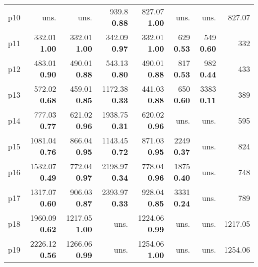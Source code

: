 \begin{tabular}{lrrrrrrr}
\multicolumn{1}{l|}{p10} & uns. & uns. & {\footnotesize 939.8} \textbf{0.88} & {\footnotesize 827.07} \textbf{1.00} & uns. & uns. & \multicolumn{1}{|r}{827.07}\\
\multicolumn{1}{l|}{p11} & {\footnotesize 332.01} \textbf{1.00} & {\footnotesize 332.01} \textbf{1.00} & {\footnotesize 342.09} \textbf{0.97} & {\footnotesize 332.01} \textbf{1.00} & {\footnotesize 629} \textbf{0.53} & {\footnotesize 549} \textbf{0.60} & \multicolumn{1}{|r}{332}\\
\multicolumn{1}{l|}{p12} & {\footnotesize 483.01} \textbf{0.90} & {\footnotesize 490.01} \textbf{0.88} & {\footnotesize 543.13} \textbf{0.80} & {\footnotesize 490.01} \textbf{0.88} & {\footnotesize 817} \textbf{0.53} & {\footnotesize 982} \textbf{0.44} & \multicolumn{1}{|r}{433}\\
\multicolumn{1}{l|}{p13} & {\footnotesize 572.02} \textbf{0.68} & {\footnotesize 459.01} \textbf{0.85} & {\footnotesize 1172.38} \textbf{0.33} & {\footnotesize 441.03} \textbf{0.88} & {\footnotesize 650} \textbf{0.60} & {\footnotesize 3383} \textbf{0.11} & \multicolumn{1}{|r}{389}\\
\multicolumn{1}{l|}{p14} & {\footnotesize 777.03} \textbf{0.77} & {\footnotesize 621.02} \textbf{0.96} & {\footnotesize 1938.75} \textbf{0.31} & {\footnotesize 620.02} \textbf{0.96} & uns. & uns. & \multicolumn{1}{|r}{595}\\
\multicolumn{1}{l|}{p15} & {\footnotesize 1081.04} \textbf{0.76} & {\footnotesize 866.04} \textbf{0.95} & {\footnotesize 1143.45} \textbf{0.72} & {\footnotesize 871.03} \textbf{0.95} & {\footnotesize 2249} \textbf{0.37} & uns. & \multicolumn{1}{|r}{824}\\
\multicolumn{1}{l|}{p16} & {\footnotesize 1532.07} \textbf{0.49} & {\footnotesize 772.04} \textbf{0.97} & {\footnotesize 2198.97} \textbf{0.34} & {\footnotesize 778.04} \textbf{0.96} & {\footnotesize 1875} \textbf{0.40} & uns. & \multicolumn{1}{|r}{748}\\
\multicolumn{1}{l|}{p17} & {\footnotesize 1317.07} \textbf{0.60} & {\footnotesize 906.03} \textbf{0.87} & {\footnotesize 2393.97} \textbf{0.33} & {\footnotesize 928.04} \textbf{0.85} & {\footnotesize 3331} \textbf{0.24} & uns. & \multicolumn{1}{|r}{789}\\
\multicolumn{1}{l|}{p18} & {\footnotesize 1960.09} \textbf{0.62} & {\footnotesize 1217.05} \textbf{1.00} & uns. & {\footnotesize 1224.06} \textbf{0.99} & uns. & uns. & \multicolumn{1}{|r}{1217.05}\\
\multicolumn{1}{l|}{p19} & {\footnotesize 2226.12} \textbf{0.56} & {\footnotesize 1266.06} \textbf{0.99} & uns. & {\footnotesize 1254.06} \textbf{1.00} & uns. & uns. & \multicolumn{1}{|r}{1254.06}\\

\end{tabular}
